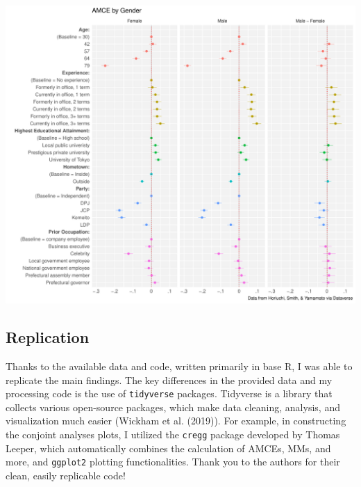 \documentclass[
]{article}
\let\origfigure\figure
\let\endorigfigure\endfigure
\renewenvironment{figure}[1][2] {
    \expandafter\origfigure\expandafter[H]
} {
    \endorigfigure
}
\begin{document}
\begin{figure}
\centering
\includegraphics{milestone_8_files/figure-latex/display-1.pdf}
\caption{\label{fig:display}The first two columns on the left display the average treatment effects for different variables, keeping the gender of the candidate constant. The third column displays the difference in average treatment effect, subtracting that of males to that of females. As you can see, party and age have large effects on candidate selection. However, when taking the different in AMCEs, there is no substantial difference between traits that are desired in male and female candidates. The average treatment effect can be interpreted as the `boost' a certain characteristic gives a candidate; negative values indicate hurting the candidate's chances of being chosen, while positive values reflect desirable traits.}
\end{figure}

\hypertarget{replication}{%
\subsection{Replication}\label{replication}}

Thanks to the available data and code, written primarily in base R, I was able to replicate the main findings. The key differences in the provided data and my processing code is the use of \texttt{tidyverse} packages. Tidyverse is a library that collects various open-source packages, which make data cleaning, analysis, and visualization much easier (Wickham et al. (2019)). For example, in constructing the conjoint analyses plots, I utilized the \texttt{cregg} package developed by Thomas Leeper, which automatically combines the calculation of AMCEs, MMs, and more, and \texttt{ggplot2} plotting functionalities. Thank you to the authors for their clean, easily replicable code!
\end{document}
